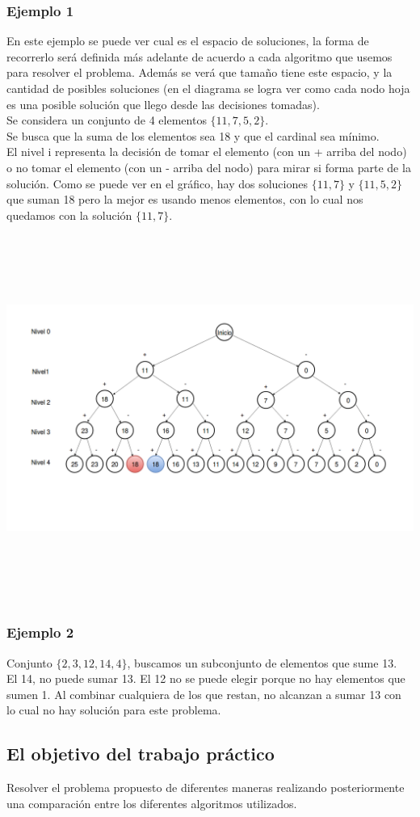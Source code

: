 \subsubsection{Ejemplo 1}
En este ejemplo se puede ver cual es el espacio de soluciones, la forma de recorrerlo será
definida más adelante  de acuerdo a cada algoritmo que usemos para resolver el problema.
Además se ver\'a que tamaño tiene este espacio, y la cantidad de posibles soluciones (en el diagrama se logra ver como cada nodo hoja es una posible soluci\'on que llego desde las decisiones tomadas).\\
Se considera un conjunto de 4 elementos $\{11,7,5,2\}$.\\
Se busca que la suma de los elementos sea 18 y que el cardinal sea mínimo.\\
El nivel i representa la decisión de tomar el elemento (con un + arriba del nodo) o no
tomar el elemento (con un - arriba del nodo) para mirar si forma parte de la solución.
Como se puede ver en el gráfico, hay dos soluciones $\{11,7\}$ y $\{11,5,2\}$ que suman 18 pero
la mejor es usando menos elementos, con lo cual nos quedamos con la solución $\{11,7\}$.
\begin{center}
\includegraphics[width=18cm, height=12cm]{diagrama.png}
\end{center}
\subsubsection{Ejemplo 2}
Conjunto $\{2, 3, 12, 14, 4\}$, buscamos un subconjunto de elementos que sume 13.\\
El 14, no puede sumar 13. El 12 no se puede elegir porque no hay elementos que sumen 1. Al combinar cualquiera de los que restan, no alcanzan a sumar 13 con lo cual no hay soluci\'on para este problema.\\


\subsection{El objetivo del trabajo pr\'actico}
 Resolver el problema propuesto de diferentes maneras realizando posteriormente una comparaci\'on entre los diferentes algoritmos utilizados.